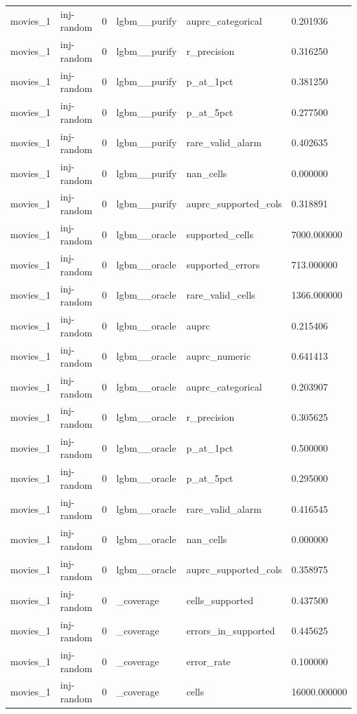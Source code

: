 \begin{tabular}{llllll}
movies\_1 & inj-random & 0 & lgbm\_\_purify & auprc\_categorical & 0.201936 \\
movies\_1 & inj-random & 0 & lgbm\_\_purify & r\_precision & 0.316250 \\
movies\_1 & inj-random & 0 & lgbm\_\_purify & p\_at\_1pct & 0.381250 \\
movies\_1 & inj-random & 0 & lgbm\_\_purify & p\_at\_5pct & 0.277500 \\
movies\_1 & inj-random & 0 & lgbm\_\_purify & rare\_valid\_alarm & 0.402635 \\
movies\_1 & inj-random & 0 & lgbm\_\_purify & nan\_cells & 0.000000 \\
movies\_1 & inj-random & 0 & lgbm\_\_purify & auprc\_supported\_cols & 0.318891 \\
movies\_1 & inj-random & 0 & lgbm\_\_oracle & supported\_cells & 7000.000000 \\
movies\_1 & inj-random & 0 & lgbm\_\_oracle & supported\_errors & 713.000000 \\
movies\_1 & inj-random & 0 & lgbm\_\_oracle & rare\_valid\_cells & 1366.000000 \\
movies\_1 & inj-random & 0 & lgbm\_\_oracle & auprc & 0.215406 \\
movies\_1 & inj-random & 0 & lgbm\_\_oracle & auprc\_numeric & 0.641413 \\
movies\_1 & inj-random & 0 & lgbm\_\_oracle & auprc\_categorical & 0.203907 \\
movies\_1 & inj-random & 0 & lgbm\_\_oracle & r\_precision & 0.305625 \\
movies\_1 & inj-random & 0 & lgbm\_\_oracle & p\_at\_1pct & 0.500000 \\
movies\_1 & inj-random & 0 & lgbm\_\_oracle & p\_at\_5pct & 0.295000 \\
movies\_1 & inj-random & 0 & lgbm\_\_oracle & rare\_valid\_alarm & 0.416545 \\
movies\_1 & inj-random & 0 & lgbm\_\_oracle & nan\_cells & 0.000000 \\
movies\_1 & inj-random & 0 & lgbm\_\_oracle & auprc\_supported\_cols & 0.358975 \\
movies\_1 & inj-random & 0 & \_coverage & cells\_supported & 0.437500 \\
movies\_1 & inj-random & 0 & \_coverage & errors\_in\_supported & 0.445625 \\
movies\_1 & inj-random & 0 & \_coverage & error\_rate & 0.100000 \\
movies\_1 & inj-random & 0 & \_coverage & cells & 16000.000000 \\

\end{tabular}
